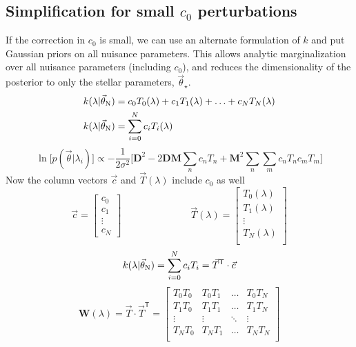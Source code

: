 \documentclass[preprint]{aastex} %
\newcommand{\vt}{\vec{\theta}}
\newcommand{\vstar}{\vt_{\star}}
\newcommand{\vN}{\vt_{\rm N}}
\newcommand{\vc}{\vec{c}}
\newcommand{\fM}{ {\bm M}}
\newcommand{\fD}{ {\bm D}}
\newcommand{\trans}{\mathsf{T}}
\begin{document}
\subsection{Simplification for small $c_0$ perturbations}
\label{sec:gaussian_simplification}
If the correction in $c_0$ is small, we can use an alternate formulation of $k$ and put Gaussian priors on all nuisance parameters. This allows analytic marginalization over all nuisance parameters (including $c_0$), and reduces the dimensionality of the posterior to only the stellar parameters, $\vstar$.
\begin{align}
  k(\lambda | \vN) &= c_0 T_0(\lambda) + c_1 T_1(\lambda) + \ldots + c_N T_N(\lambda) \\
  k(\lambda | \vN) &= \sum^N_{i = 0} c_i T_i(\lambda)
\end{align}
\begin{equation}
 \ln \bigl [p(\vt | \lambda_i) \bigr] \propto -\frac{1}{2 \sigma^2} \bigl [ \fD^2 - 2 \fD \fM \sum_n c_n T_n + \fM^2 \sum_n \sum_m c_n T_n c_m T_m \bigr ]
 \end{equation}
Now the column vectors $\vc$ and $\vec{T}(\lambda)$ include $c_0$ as well
\begin{equation}
  \vc = 
  \begin{bmatrix}
    c_0\\
    c_1\\
    \vdots\\
    c_N
  \end{bmatrix}
  \hspace{3cm}
\vec{T}(\lambda) = 
\begin{bmatrix}
T_0(\lambda)\\
T_1(\lambda)\\
\vdots\\
T_N(\lambda)\\
\end{bmatrix}
\end{equation}
\begin{equation}
  k(\lambda | \vN) = \sum^N_{i = 0} c_i T_i = \vec{T}^\trans \cdot \vc
\end{equation}
\begin{equation}
  {\bm W}(\lambda) = \vec{T} \cdot \vec{T}^\trans = 
  \begin{bmatrix}
T_0 T_0 & T_0 T_1 &  \hdots & T_0 T_N \\
T_1 T_0 & T_1 T_1 &  \hdots & T_1 T_N \\
\vdots  & \vdots  &  \ddots & \vdots \\
T_N T_0 & T_N T_1 &  \hdots & T_N T_N \\
  \end{bmatrix}
\end{equation}
\end{document}
